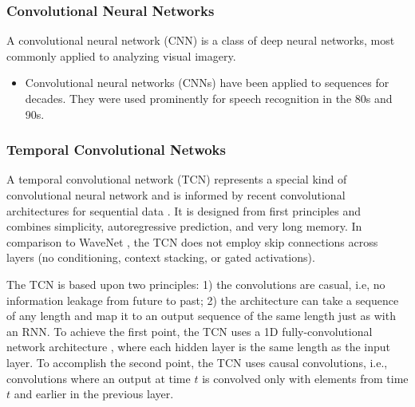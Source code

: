 \documentclass{scrartcl}
\begin{document}
\subsubsection{Convolutional Neural Networks}

A convolutional neural network (CNN) is a class of deep neural networks, most commonly applied to analyzing visual imagery.

\begin{itemize}
\item Convolutional neural networks (CNNs) \cite{LeCun1989} have been applied to sequences for decades. They were used prominently for speech recognition in the 80s and 90s.
\end{itemize}



\subsubsection{Temporal Convolutional Netwoks}

A temporal convolutional network (TCN)  represents a special kind of convolutional neural network and is informed by recent convolutional architectures for sequential data \cite{Bai2018}. It is designed from first principles and combines simplicity, autoregressive prediction, and very long memory. In comparison to WaveNet \cite{Oord2016}, the TCN does not employ skip connections across layers (no conditioning, context stacking, or gated activations).

The TCN is based upon two principles: 1) the convolutions are casual, i.e, no information leakage from future to past; 2) the architecture can take a sequence of any length and map it to an output sequence of the same length just as with an RNN. To achieve the first point, the TCN uses a 1D fully-convolutional network architecture \cite{Long2015}, where each hidden layer is the same length as the input layer. To accomplish the second point, the TCN uses causal convolutions, i.e., convolutions where an output at time $t$ is convolved only with elements from time $t$ and earlier in the previous layer.
\end{document}
